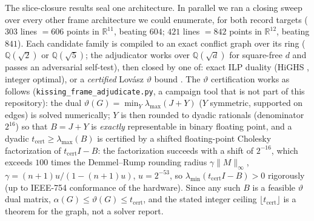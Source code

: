 \documentclass[11pt]{article}
\theoremstyle{remark}
\newcommand{\RR}{\mathbb{R}}
\newcommand{\QQ}{\mathbb{Q}}
\begin{document}
The slice-closure results seal one architecture. In parallel we ran a
closing sweep over every other frame architecture we could enumerate, for
both record targets ($303$ lines $=606$ points in $\RR^{11}$, beating
$604$; $421$ lines $=842$ points in $\RR^{12}$, beating $841$). Each
candidate family is compiled to an exact conflict graph over its ring
($\QQ(\sqrt2)$ or $\QQ(\sqrt5)$; the adjudicator works over $\QQ(\sqrt d)$
for square-free $d$ and passes an adversarial self-test), then closed by
one of: exact ILP duality (HiGHS \cite{HiGHS18}, integer optimal), or a
\emph{certified} Lov\'asz $\vartheta$ bound \cite{Lovasz79}. The
$\vartheta$ certification works as follows
(\texttt{kissing\_frame\_adjudicate.py}, a campaign tool that is not part
of this repository): the dual
$\vartheta(G)=\min_Y\lambda_{\max}(J+Y)$ ($Y$ symmetric, supported on
edges) is solved numerically; $Y$ is then rounded to dyadic rationals
(denominator $2^{16}$) so that $B=J+Y$ is \emph{exactly} representable in
binary floating point, and a dyadic $t_{\mathrm{cert}}\ge
\lambda_{\max}(B)$ is certified by a shifted floating-point Cholesky
factorization of $t_{\mathrm{cert}}I-B$: the factorization succeeds with a
shift of $2^{-16}$, which exceeds $100$ times the Demmel--Rump rounding
radius $\gamma\lVert M\rVert_\infty$, $\gamma=(n{+}1)u/(1-(n{+}1)u)$,
$u=2^{-53}$, so $\lambda_{\min}(t_{\mathrm{cert}}I-B)>0$ rigorously (up to
IEEE-754 conformance of the hardware). Since any such $B$ is a feasible
$\vartheta$ dual matrix, $\alpha(G)\le\vartheta(G)\le t_{\mathrm{cert}}$,
and the stated integer ceiling $\lfloor t_{\mathrm{cert}}\rfloor$ is a
theorem for the graph, not a solver report.
\end{document}
